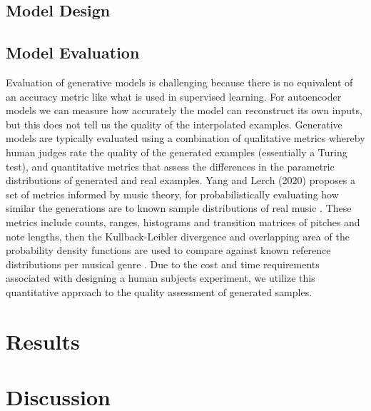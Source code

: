 \documentclass[sigconf,authorversion]{acmart}
\begin{document}
\subsection{Model Design}

\subsection{Model Evaluation}

Evaluation of generative models is challenging because there is no
equivalent of an accuracy metric like what is used in supervised
learning. For autoencoder models we can measure how accurately the
model can reconstruct its own inputs, but this does not tell us the
quality of the interpolated examples. Generative models are typically
evaluated using a combination of qualitative metrics whereby human
judges rate the quality of the generated examples (essentially a
Turing test), and quantitative metrics that assess the differences in
the parametric distributions of generated and real examples. Yang and
Lerch (2020) proposes a set of metrics informed by music theory, for
probabilistically evaluating how similar the generations are to known
sample distributions of real music \cite{yang_evaluation_2020}. These
metrics include counts, ranges, histograms and transition matrices of
pitches and note lengths, then the Kullback-Leibler divergence and
overlapping area of the probability density functions are used to
compare against known reference distributions per musical genre
\cite{yang_evaluation_2020}. Due to the cost and time requirements
associated with designing a human subjects experiment, we
utilize this quantitative approach to the quality assessment of
generated samples.

\section{Results}

\section{Discussion}



\end{document}
